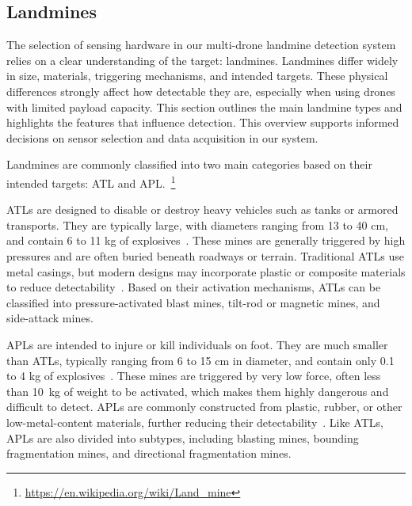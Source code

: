 \subsection{Landmines} \label{landmines}

The selection of sensing hardware in our multi-drone landmine detection system relies on a clear understanding of the target: landmines. Landmines differ widely in size, materials, triggering mechanisms, and intended targets. These physical differences strongly affect how detectable they are, especially when using drones with limited payload capacity. This section outlines the main landmine types and highlights the features that influence detection. This overview supports informed decisions on sensor selection and data acquisition in our system.

Landmines are commonly classified into two main categories based on their intended targets: \gls{ATL} and \gls{APL}.~\footnote{\url{https://en.wikipedia.org/wiki/Land_mine}}

\gls{ATL}s are designed to disable or destroy heavy vehicles such as tanks or armored transports. They are typically large, with diameters ranging from 13 to 40 cm, and contain 6 to 11 kg of explosives~\cite{paik2002image}. These mines are generally triggered by high pressures and are often buried beneath roadways or terrain. Traditional \gls{ATL}s use metal casings, but modern designs may incorporate plastic or composite materials to reduce detectability~\cite{evans2024detection}. Based on their activation mechanisms, \gls{ATL}s can be classified into pressure-activated blast mines, tilt-rod or magnetic mines, and side-attack mines.

\gls{APL}s are intended to injure or kill individuals on foot. They are much smaller than \gls{ATL}s, typically ranging from 6 to 15 cm in diameter, and contain only 0.1 to 4 kg of explosives~\cite{paik2002image}. These mines are triggered by very low force, often less than 10~kg of weight to be activated, which makes them highly dangerous and difficult to detect. \gls{APL}s are commonly constructed from plastic, rubber, or other low-metal-content materials, further reducing their detectability~\cite{kaya2017buried}. Like \gls{ATL}s, \gls{APL}s are also divided into subtypes, including blasting mines, bounding fragmentation mines, and directional fragmentation mines.

